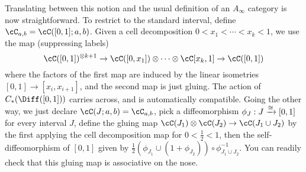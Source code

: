 {Translating between this notion and the usual definition of an $A_\infty$ category is now straightforward.
To restrict to the standard interval, define $\cC_{a,b} = \cC([0,1];a,b)$.
Given a cell decomposition $0 < x_1< \cdots < x_k < 1$, we use the map (suppressing labels)
$$\cC([0,1])^{\tensor k+1} \to \cC([0,x_1]) \tensor \cdots \tensor \cC[x_k,1] \to \cC([0,1])$$
where the factors of the first map are induced by the linear isometries $[0,1] \to [x_i, x_{i+1}]$, and the second map is just gluing.
The action of $\CD{[0,1]}$ carries across, and is automatically compatible.
Going the other way, we just declare $\cC(J;a,b) = \cC_{a,b}$, pick a diffeomorphism 
$\phi_J : J \xrightarrow{\cong} [0,1]$ for every interval $J$, define the gluing map 
$\cC(J_1) \tensor \cC(J_2) \to \cC(J_1 \cup J_2)$ by the first applying 
the cell decomposition map for $0 < \frac{1}{2} < 1$, then the self-diffeomorphism of $[0,1]$ 
given by $\frac{1}{2} (\phi_{J_1} \cup (1+ \phi_{J_2})) \circ \phi_{J_1 \cup J_2}^{-1}$.
You can readily check that this gluing map is associative on the nose. 




}
